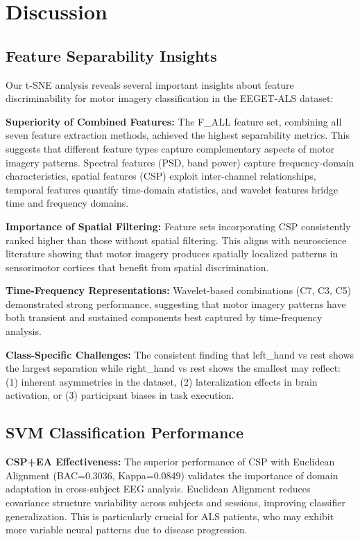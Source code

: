 \documentclass[conference]{IEEEtran}
\begin{document}
\section{Discussion}

\subsection{Feature Separability Insights}

Our t-SNE analysis reveals several important insights about feature discriminability for motor imagery classification in the EEGET-ALS dataset:

\textbf{Superiority of Combined Features:} The F\_ALL feature set, combining all seven feature extraction methods, achieved the highest separability metrics. This suggests that different feature types capture complementary aspects of motor imagery patterns. Spectral features (PSD, band power) capture frequency-domain characteristics, spatial features (CSP) exploit inter-channel relationships, temporal features quantify time-domain statistics, and wavelet features bridge time and frequency domains.

\textbf{Importance of Spatial Filtering:} Feature sets incorporating CSP consistently ranked higher than those without spatial filtering. This aligns with neuroscience literature showing that motor imagery produces spatially localized patterns in sensorimotor cortices that benefit from spatial discrimination.

\textbf{Time-Frequency Representations:} Wavelet-based combinations (C7, C3, C5) demonstrated strong performance, suggesting that motor imagery patterns have both transient and sustained components best captured by time-frequency analysis.

\textbf{Class-Specific Challenges:} The consistent finding that left\_hand vs rest shows the largest separation while right\_hand vs rest shows the smallest may reflect: (1) inherent asymmetries in the dataset, (2) lateralization effects in brain activation, or (3) participant biases in task execution.

\subsection{SVM Classification Performance}

\textbf{CSP+EA Effectiveness:} The superior performance of CSP with Euclidean Alignment (BAC=0.3036, Kappa=0.0849) validates the importance of domain adaptation in cross-subject EEG analysis. Euclidean Alignment reduces covariance structure variability across subjects and sessions, improving classifier generalization. This is particularly crucial for ALS patients, who may exhibit more variable neural patterns due to disease progression.
\end{document}
